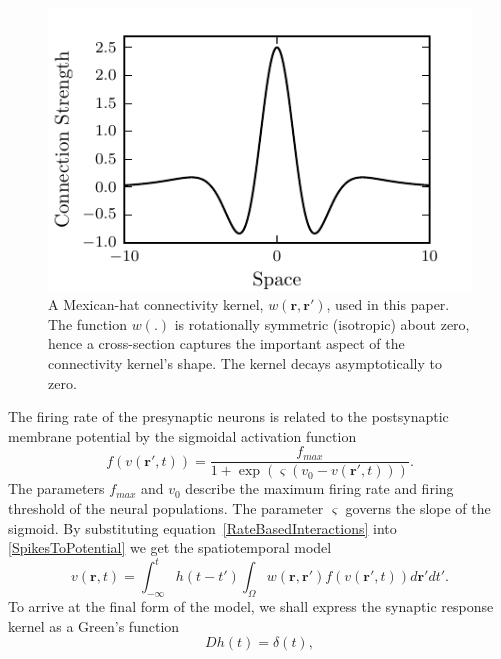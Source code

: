 \documentclass[10pt,a4paper]{article}
\begin{document}
\begin{figure}\label{fig:2d_kernel}
   	\begin{center}
   		\includegraphics{./Graph/Cross_section_kernel.pdf} 
   	\end{center}
   	\caption{A Mexican-hat connectivity kernel, $w(\mathbf{r},\mathbf{r'})$, used in this paper. The function $w(.)$ is rotationally symmetric (isotropic) about zero, hence a cross-section captures the important aspect of the connectivity kernel's shape. The kernel decays asymptotically to zero.} 
   \end{figure}
The firing rate of the presynaptic neurons is related to the postsynaptic membrane potential by the sigmoidal activation function 
\begin{equation}
	\label{ActivationFunction} f\left( v\left( \mathbf{r}', t \right) \right) = \frac{f_{max}}{1 + \exp \left( \varsigma \left( v_0 - v\left(\mathbf{r}',t\right) \right) \right)}. 
\end{equation}
The parameters $f_{max}$ and $v_0$ describe the maximum firing rate and firing threshold of the neural populations. The parameter $\varsigma$ governs the slope of the sigmoid. By substituting equation~\ref{RateBasedInteractions} into \ref{SpikesToPotential} we get the spatiotemporal model 
\begin{equation}
	\label{FullDoubleIntModel} v\left(\mathbf{r},t\right) =
	\int_{-\infty}^t 
	h\left(t - t'\right) \int_\Omega
	w\left(\mathbf{r},\mathbf{r}'\right) 
	f\left( v\left( \mathbf{r}',t \right)\right)
	d\mathbf{r}'dt'.
\end{equation}
To arrive at the final form of the model, we shall express the synaptic response kernel as a Green's function 
\begin{equation}
	\label{GreensFuncDef} Dh\left( t \right) = \delta \left( t \right), 
\end{equation}
\end{document}
